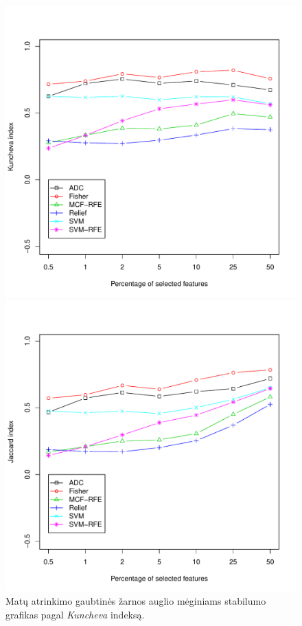 \begin{figure}[H]
\label{visi_stabilumas}
\begin{minipage}[b]{0.47\linewidth}
\centering
\includegraphics[width=.85\textwidth]{../bachelor/images/nncolon_robustness_kuncheva.pdf}
\caption{Matų atrinkimo gaubtinės žarnos auglio mėginiams stabilumo grafikas pagal \textit{Kuncheva} indeksą.}
\label{fig:robk_colon}
\end{minipage}
\hspace{0.2cm}
\begin{minipage}[b]{0.47\linewidth}
\centering
\includegraphics[width=.85\textwidth]{../bachelor/images/nncolon_robustness_jaccard.pdf}

\end{minipage}
\end{figure}
